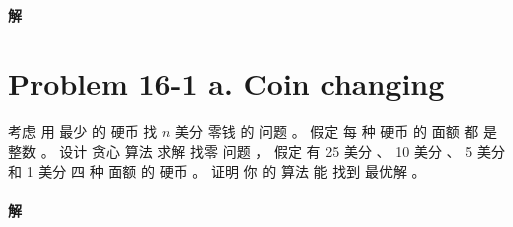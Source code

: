 \documentclass{article}
\begin{document}
\paragraph{解}

\section{Problem 16-1 a. Coin changing }
考虑 用 最少 的 硬币 找 $n$ 美分 零钱 的 问题 。 假定 每 种 硬币 的 面额 都 是 整数 。 设计 贪心 算法 求解 找零 问题 ， 假定 有 25 美分 、 10 美分 、 5 美分 和 1 美分 四 种 面额 的 硬币 。 证明 你 的 算法 能 找到 最优解 。

\paragraph{解}
\end{document}
